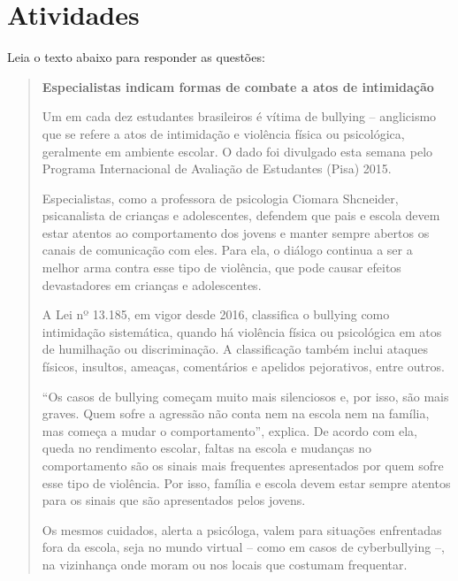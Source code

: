 
\section{Atividades}

Leia o texto abaixo para responder as questões:

\begin{quote}

\textbf{Especialistas indicam formas de combate a atos de intimidação}

Um em cada dez estudantes brasileiros é vítima de bullying -- anglicismo
que se refere a atos de intimidação e violência física ou psicológica,
geralmente em ambiente escolar. O dado foi divulgado esta semana pelo
Programa Internacional de Avaliação de Estudantes (Pisa) 2015.

Especialistas, como a professora de psicologia Ciomara Shcneider,
psicanalista de crianças e adolescentes, defendem que pais e escola
devem estar atentos ao comportamento dos jovens e manter sempre abertos
os canais de comunicação com eles. Para ela, o diálogo continua a ser a
melhor arma contra esse tipo de violência, que pode causar efeitos
devastadores em crianças e adolescentes.

A Lei nº 13.185, em vigor desde 2016, classifica o bullying como
intimidação sistemática, quando há violência física ou psicológica em
atos de humilhação ou discriminação. A classificação também inclui
ataques físicos, insultos, ameaças, comentários e apelidos pejorativos,
entre outros.

``Os casos de bullying começam muito mais silenciosos e, por isso, são
mais graves. Quem sofre a agressão não conta nem na escola nem na
família, mas começa a mudar o comportamento'', explica. De acordo com
ela, queda no rendimento escolar, faltas na escola e mudanças no
comportamento são os sinais mais frequentes apresentados por quem sofre
esse tipo de violência. Por isso, família e escola devem estar sempre
atentos para os sinais que são apresentados pelos jovens.

Os mesmos cuidados, alerta a psicóloga, valem para situações enfrentadas
fora da escola, seja no mundo virtual -- como em casos de cyberbullying
--, na vizinhança onde moram ou nos locais que costumam frequentar.

\end{quote}

